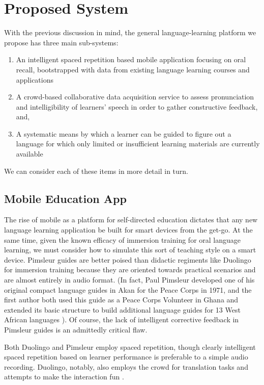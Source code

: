 \section{Proposed System} 
With the previous discussion in mind, the general language-learning platform we propose has three main sub-systems:
\begin{enumerate}
\item An intelligent spaced repetition based mobile application focusing on oral recall, bootstrapped with data from existing language learning courses and applications
\item A crowd-based collaborative data acquisition service to assess pronunciation and intelligibility of learners' speech in order to gather constructive feedback, and,
\item A systematic means by which a learner can be guided to figure out a language for which only limited or insufficient learning materials are currently available
\end{enumerate}

We can consider each of these items in more detail in turn.

\subsection{Mobile Education App}
The rise of mobile as a platform for self-directed education dictates that any new language learning application be built for smart devices from the get-go. At the same time, given the known efficacy of immersion training for oral language learning, we must consider how to simulate this sort of teaching style on a smart device. Pimsleur guides are better poised than didactic regiments like Duolingo for immersion training because they are oriented towards practical scenarios and are almost entirely in audio format. (In fact, Paul Pimsleur developed one of his original compact language guides in Akan for the Peace Corps in 1971, and the first author both used this guide as a Peace Corps Volunteer in Ghana and extended its basic structure to build additional language guides for 13 West African languages \cite{wolfeapplause} \cite{wikipimsleur} \cite{wolfeclap}). Of course, the lack of intelligent corrective feedback in Pimsleur guides is an admittedly critical flaw. 

Both Duolingo and Pimsleur employ spaced repetition, though clearly intelligent spaced repetition based on learner performance is preferable to a simple audio recording. Duolingo, notably, also employs the crowd for translation tasks and attempts to make the interaction fun \cite{vesselinov2012duolingo} \cite{garcia2013learning}. 

